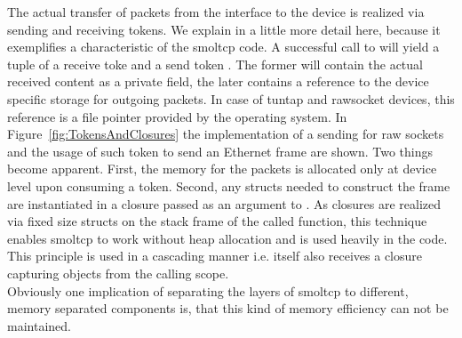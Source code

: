 The actual transfer of packets from the interface to the device is realized via sending and receiving tokens. We explain in a little more detail here, because it exemplifies a characteristic of the smoltcp code. A successful call to  will yield a tuple of a receive toke  and a send token . The former will contain the actual received content as a private field, the later contains a reference to the device specific storage for outgoing packets. In case of tuntap and rawsocket devices, this reference is a file pointer provided by the operating system. In Figure~\ref{fig:TokensAndClosures} the implementation of a sending  for raw sockets and the usage of such token to send an Ethernet frame are shown. Two things become apparent. First, the memory for the packets is allocated only at device level upon consuming a token. Second, any structs needed to construct the frame are instantiated in a closure passed as an argument to . As closures are realized via fixed size structs on the stack frame of the called function, this technique enables smoltcp to work without heap allocation and is used heavily in the code. This principle is used in a cascading manner i.e.  itself also receives a closure capturing objects from the calling scope.\\

Obviously one implication of separating the layers of smoltcp to different, memory separated components is, that this kind of memory efficiency can not be maintained. 

